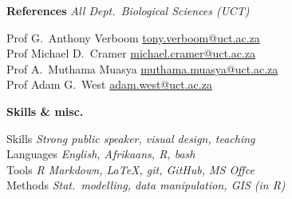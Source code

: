 \documentclass[10pt]{article}
\begin{document}
\begin{multicols}{2} %

\textbf{References} %
                    \hfill {\small \textit{All Dept.~Biological Sciences (UCT)}}

Prof G.~Anthony Verboom
      \hfill     \href{mailto:tony.verboom@uct.ac.za}{tony.verboom@uct.ac.za} \\
Prof Michael D.~Cramer
      \hfill \href{mailto:michael.cramer@uct.ac.za}{michael.cramer@uct.ac.za} \\
Prof A.~Muthama Muasya
      \hfill \href{mailto:muthama.muasya@uct.ac.za}{muthama.muasya@uct.ac.za} \\
Prof Adam G.~West
      \hfill           \href{mailto:adam.west@uct.ac.za}{adam.west@uct.ac.za}

\columnbreak

\textbf{Skills \& misc.} %


Skills         \hfill \textit{Strong public speaker, visual design, teaching} \\
Languages      \hfill \textit{                   English, Afrikaans, R, bash} \\
Tools          \hfill \textit{      R Markdown, LaTeX, git, GitHub, MS Offce} \\
Methods        \hfill \textit{Stat.~modelling, data manipulation, GIS (in R)}

\end{multicols} %
\end{document}
